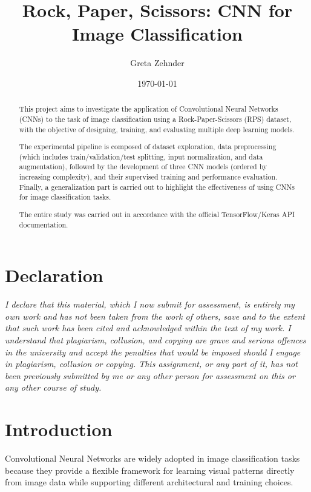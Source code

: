 \documentclass[11pt,a4paper]{article}
\title{Rock, Paper, Scissors: CNN for Image Classification}
\author{Greta Zehnder}
\date{\today}
\begin{document}
\maketitle

\begin{abstract}
    This project aims to investigate the application of Convolutional Neural Networks (CNNs) to the task of image classification using a Rock-Paper-Scissors (RPS) dataset, with the objective of designing, training, and evaluating multiple deep learning models. 

The experimental pipeline is composed of dataset exploration, data preprocessing (which includes train/validation/test splitting, input normalization, and data augmentation), followed by the development of three CNN models (ordered by increasing complexity), and their supervised training and performance evaluation. Finally, a generalization part is carried out to highlight the effectiveness of using CNNs for image classification tasks.

The entire study was carried out in accordance with the official TensorFlow/Keras API documentation.

\end{abstract}

\section*{Declaration}
\small\textit{
I declare that this material, which I now submit for assessment, is entirely my own work and has not been taken from the work of others, save and to the extent that such work has been cited and acknowledged within the text of my work. I understand that plagiarism, collusion, and copying are grave and serious offences in the university and accept the penalties that would be imposed should I engage in plagiarism, collusion or copying. This assignment, or any part of it, has not been previously submitted by me or any other person for assessment on this or any other course of study.
}
\normalsize


\tableofcontents
\newpage

\section{Introduction}

Convolutional Neural Networks are widely adopted in image classification tasks because they provide a flexible framework for learning visual patterns directly from image data while supporting different architectural and training choices.
\end{document}
